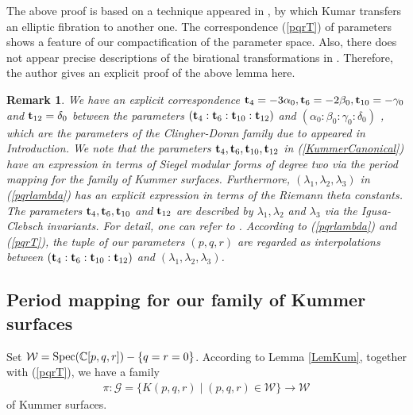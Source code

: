 \documentclass[10pt]{article}
\newtheorem{rem}{Remark}[section]
\begin{document}
The above proof is based on a technique appeared in \cite{Kumar},
by which Kumar transfers an elliptic fibration to another one.
The correspondence (\ref{pqrT}) of parameters shows a feature of our  compactification of the parameter space.
Also,
there does not appear  precise descriptions of the birational transformations  in \cite{Kumar}.
Therefore,
the author  gives an explicit proof of the above lemma here.


\begin{rem}\label{pqrRem}
We have an explicit correspondence
$
{\bf t}_4=-3\alpha_0, {\bf t}_6=-2\beta_0,  {\bf t}_{10}=-\gamma_0$ and ${\bf t}_{12}=\delta_0$
between the parameters $({\bf t}_4:{\bf t}_6:{\bf t}_{10}:{\bf t}_{12})$ and $(\alpha_0:\beta_0:\gamma_0:\delta_0)$ ,
which are the parameters of the Clingher-Doran family due to \cite{CD} appeared in Introduction.
We note that the parameters ${\bf t}_4,  {\bf t}_6, {\bf t}_{10},{\bf t}_{12}$ in (\ref{KummerCanonical}) have an expression in terms of Siegel modular forms of degree two via the period mapping for the family of Kummer surfaces.
Furthermore, 
$(\lambda_1,\lambda_2,\lambda_3)$ in (\ref{pqrlambda}) has an explicit expression in terms of  the Riemann theta constants.
The parameters ${\bf t}_4,  {\bf t}_6, {\bf t}_{10}$ and ${\bf t}_{12}$ are described by  $\lambda_1,\lambda_2$ and $\lambda_3$  via the Igusa-Clebsch invariants.
For detail, one can refer to \cite{NS1}.
According to (\ref{pqrlambda}) and (\ref{pqrT}),
the tuple of our parameters $(p,q,r)$ are regarded as interpolations between $({\bf t}_4:  {\bf t}_6: {\bf t}_{10} : {\bf t}_{12})$ and  $(\lambda_1,\lambda_2,\lambda_3)$. 
\end{rem}



\subsection{Period mapping for our family of Kummer surfaces}

Set $\mathcal{W} = {\rm Spec}(\mathbb{C}[p,q,r]) - \{q=r=0\}$.
According to Lemma \ref{LemKum}, together with (\ref{pqrT}),   we have a family
\begin{align}\label{KummerFamily1}
\pi: \mathcal{G}=\{K(p,q,r) \mid (p,q,r) \in \mathcal{W} \} \rightarrow  \mathcal{W}
\end{align}
of Kummer surfaces.
\end{document}
